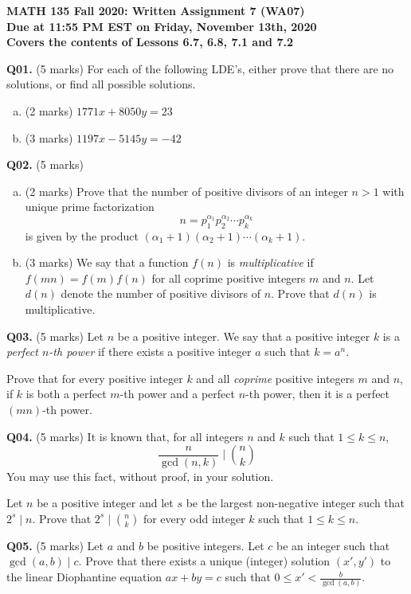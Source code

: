 \documentclass[11pt]{article}
\begin{document}
\parindent=0pt

\textbf{MATH 135 Fall 2020: Written Assignment 7 (WA07)\\Due at 11:55 PM EST on Friday, November 13th, 2020\\Covers the contents of Lessons 6.7, 6.8, 7.1 and 7.2}

\textbf{Q01.} (5 marks) For each of the following LDE's, either prove that there are no solutions, or find all possible solutions.

\begin{enumerate}[(a)]
\item (2 marks) $1771x + 8050y = 23$

\item (3 marks) $1197x - 5145y = -42$
\end{enumerate}

\textbf{Q02.} (5 marks)

\begin{enumerate}[(a)]
\item (2 marks) Prove that the number of positive divisors of an integer $n > 1$ with unique prime factorization
%
$$
n = p_1^{\alpha_1}p_2^{\alpha_2}\cdots p_k^{\alpha_k}
$$
%
is given by the product $(\alpha_1 + 1)(\alpha_2 + 1)\cdots (\alpha_k + 1)$.

\item (3 marks) We say that a function $f(n)$ is \emph{multiplicative} if $f(mn) = f(m)f(n)$ for all coprime positive integers $m$ and $n$. Let $d(n)$ denote the number of positive divisors of $n$. Prove that $d(n)$ is multiplicative.
\end{enumerate}

\textbf{Q03.} (5 marks) Let $n$ be a positive integer. We say that a positive integer $k$ is a \emph{perfect $n$-th power} if there exists a positive integer $a$ such that $k = a^n$.

Prove that for every positive integer $k$ and all \emph{coprime} positive integers $m$ and $n$, if $k$ is both a perfect $m$-th power and a perfect $n$-th power, then it is a perfect $(mn)$-th power.

\textbf{Q04.} (5 marks) It is known that, for all integers $n$ and $k$ such that $1 \leq k \leq n$,
%
$$
\left.\frac{n}{\gcd(n, k)} \mid \binom{n}{k}\right.
$$
%
You may use this fact, without proof, in your solution.

Let $n$ be a positive integer and let $s$ be the largest non-negative integer such that $2^s \mid n$. Prove that $2^s \mid \binom{n}{k}$ for every odd integer $k$ such that $1 \leq k \leq n$.

\textbf{Q05.} (5 marks) Let $a$ and $b$ be positive integers. Let $c$ be an integer such that \mbox{$\gcd(a, b) \mid c$}. Prove that there exists a unique (integer) solution $(x', y')$ to the linear Diophantine equation $ax + by = c$ such that $0 \leq x' < \frac{b}{\gcd(a, b)}$.
\end{document}
